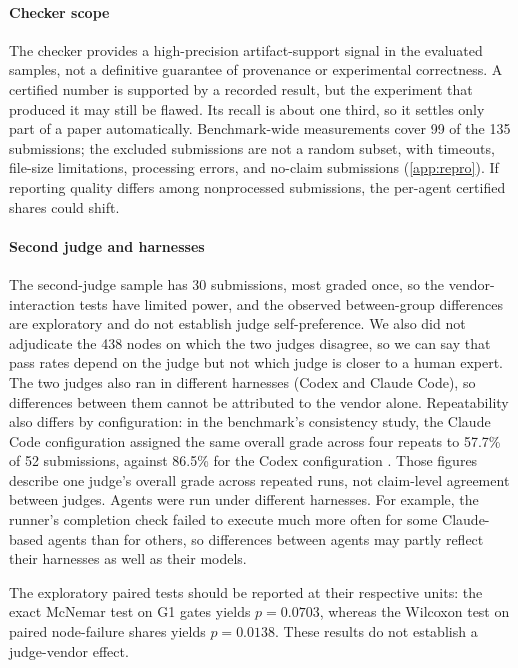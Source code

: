 \documentclass[preprint,12pt,authoryear]{elsarticle}
\begin{document}
\paragraph{Checker scope} The checker provides a high-precision artifact-support signal in the evaluated samples, not a definitive guarantee of provenance or experimental correctness. A certified number is supported by a recorded result, but the experiment that produced it may still be flawed. Its recall is about one third, so it settles only part of a paper automatically. Benchmark-wide measurements cover 99 of the 135 submissions; the excluded submissions are not a random subset, with timeouts, file-size limitations, processing errors, and no-claim submissions (\ref{app:repro}). If reporting quality differs among nonprocessed submissions, the per-agent certified shares could shift.

\paragraph{Second judge and harnesses} The second-judge sample has 30 submissions, most graded once, so the vendor-interaction tests have limited power, and the observed between-group differences are exploratory and do not establish judge self-preference. We also did not adjudicate the 438 nodes on which the two judges disagree, so we can say that pass rates depend on the judge but not which judge is closer to a human expert. The two judges also ran in different harnesses (Codex and Claude Code), so differences between them cannot be attributed to the vendor alone. Repeatability also differs by configuration: in the benchmark's consistency study, the Claude Code configuration assigned the same overall grade across four repeats to 57.7\% of 52 submissions, against 86.5\% for the Codex configuration \citep[Appendix B]{kim2026unknown}. Those figures describe one judge's overall grade across repeated runs, not claim-level agreement between judges. Agents were run under different harnesses. For example, the runner's completion check failed to execute much more often for some Claude-based agents than for others, so differences between agents may partly reflect their harnesses as well as their models.

The exploratory paired tests should be reported at their respective units: the exact McNemar test on G1 gates yields $p=0.0703$, whereas the Wilcoxon test on paired node-failure shares yields $p=0.0138$. These results do not establish a judge-vendor effect.
\end{document}
